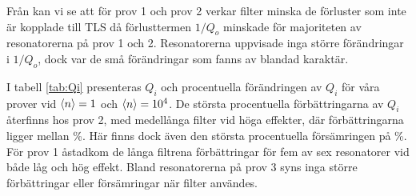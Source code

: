 \documentclass[main.tex]{subfiles}
\begin{document}
Från  kan vi se att för prov 1 och prov 2 verkar filter minska de förluster som inte är kopplade till TLS då förlusttermen $1/Q_o$ minskade för majoriteten av resonatorerna på prov 1 och 2. Resonatorerna uppvisade inga större förändringar i $1/Q_o$, dock var de små förändringar som fanns av blandad karaktär.







I tabell \ref{tab:Qi} presenteras $Q_i$ och procentuella förändringen av $Q_i$ för våra prover vid $\expval{n}=1$ och $\expval{n}=10^4$. De största procentuella förbättringarna av $Q_i$ återfinns hos prov 2, med medellånga filter vid höga effekter, där förbättringarna ligger mellan \unit[11-46]{\%}. Här finns dock även den största procentuella försämringen på \unit[-46]{\%}. För prov 1 åstadkom de långa filtrena förbättringar för fem av sex resonatorer vid både låg och hög effekt. Bland resonatorerna på prov 3 syns inga större förbättringar eller försämringar när filter användes.
\end{document}
